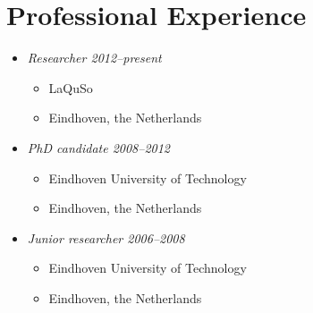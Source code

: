 \section*{Professional Experience}
\begin{itemize} \parskip 0pt \itemsep 4pt
  \item[]
    {\it Researcher \hfill 2012--present}
    \begin{itemize}
      \item[] LaQuSo
      \item[] Eindhoven, the Netherlands
    \end{itemize}
  \item[]
    {\it PhD candidate \hfill 2008--2012}
    \begin{itemize}
      \item[] Eindhoven University of Technology
      \item[] Eindhoven, the Netherlands
    \end{itemize}
  \item[]
    {\it Junior researcher \hfill 2006--2008}
    \begin{itemize}
      \item[] Eindhoven University of Technology
      \item[] Eindhoven, the Netherlands
    \end{itemize}
\end{itemize} 